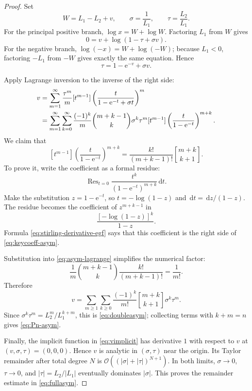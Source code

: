 \documentclass[11pt]{article}
\theoremstyle{remark}
\newcommand{\ee}{\mathrm e}
\newcommand{\Res}{\operatorname{Res}}
\newcommand{\bigO}{\mathcal O}
\newcommand{\stirling}[2]{\genfrac{[}{]}{0pt}{}{#1}{#2}}
\newcommand{\dd}{\,\mathrm d}
\begin{document}
\begin{proof}
Set
\[
       W=L_1-L_2+v,\qquad
       \sigma=\frac1{L_1},\qquad
       \tau=\frac{L_2}{L_1}.
\]
For the principal positive branch,
\(\log x=W+\log W\).  Factoring \(L_1\) from \(W\) gives
\[
 0=v+\log(1-\tau+\sigma v).
\]
For the negative branch, \(\log(-x)=W+\log(-W)\); because \(L_1<0\),
factoring \(-L_1\) from \(-W\) gives exactly the same equation.  Hence
\begin{equation}\label{eq:vimplicit}
       \tau=1-\ee^{-v}+\sigma v.
\end{equation}

Apply Lagrange inversion to the inverse of the right side:
\begin{align}
 v
 &=\sum_{m=1}^{\infty}\frac{\tau^m}{m}
 [t^{m-1}]
 \left(\frac{t}{1-\ee^{-t}+\sigma t}\right)^m\notag\\
 &=\sum_{m=1}^{\infty}\sum_{k=0}^{\infty}
 \frac{(-1)^k}{m}
 \binom{m+k-1}{k}\sigma^k\tau^m
 [t^{m-1}]
 \left(\frac{t}{1-\ee^{-t}}\right)^{m+k}.
 \label{eq:asym-lagrange}
\end{align}
We claim that
\begin{equation}\label{eq:keycoeff-asym}
 [t^{m-1}]
 \left(\frac{t}{1-\ee^{-t}}\right)^{m+k}
 =\frac{k!}{(m+k-1)!}\stirling{m+k}{k+1}.
\end{equation}
To prove it, write the coefficient as a formal residue:
\[
 \Res_{t=0}\frac{t^k}{(1-\ee^{-t})^{m+k}}\dd t.
\]
Make the substitution \(z=1-\ee^{-t}\), so
\(t=-\log(1-z)\) and \(\dd t=\dd z/(1-z)\).  The residue becomes the
coefficient of \(z^{m+k-1}\) in
\[
       \frac{[-\log(1-z)]^k}{1-z}.
\]
Formula \eqref{eq:stirling-derivative-egf} says that this coefficient is the
right side of \eqref{eq:keycoeff-asym}.

Substitution into \eqref{eq:asym-lagrange} simplifies the numerical factor:
\[
 \frac1m\binom{m+k-1}{k}\frac{k!}{(m+k-1)!}
 =\frac1{m!}.
\]
Therefore
\[
 v=\sum_{m\geq1}\sum_{k\geq0}
 \frac{(-1)^k}{m!}\stirling{m+k}{k+1}
 \sigma^k\tau^m.
\]
Since \(\sigma^k\tau^m=L_2^m/L_1^{k+m}\), this is
\eqref{eq:doubleasym}; collecting terms with \(k+m=n\) gives
\eqref{eq:Pn-asym}.

Finally, the implicit function in \eqref{eq:vimplicit} has derivative \(1\)
with respect to \(v\) at \((v,\sigma,\tau)=(0,0,0)\).  Hence \(v\) is
analytic in \((\sigma,\tau)\) near the origin.  Its Taylor remainder after
total degree \(N\) is
\(\bigO((|\sigma|+|\tau|)^{N+1})\).  In both limits,
\(\sigma\to0\), \(\tau\to0\), and
\(|\tau|=L_2/|L_1|\) eventually dominates \(|\sigma|\).  This proves the
remainder estimate in \eqref{eq:fullasym}.
\end{proof}
\end{document}
